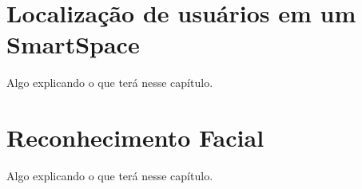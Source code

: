 
\chapter{Localização de usuários em um SmartSpace}

	Algo explicando o que terá nesse capítulo.

	

\chapter{Reconhecimento Facial}

	Algo explicando o que terá nesse capítulo.


	
	








